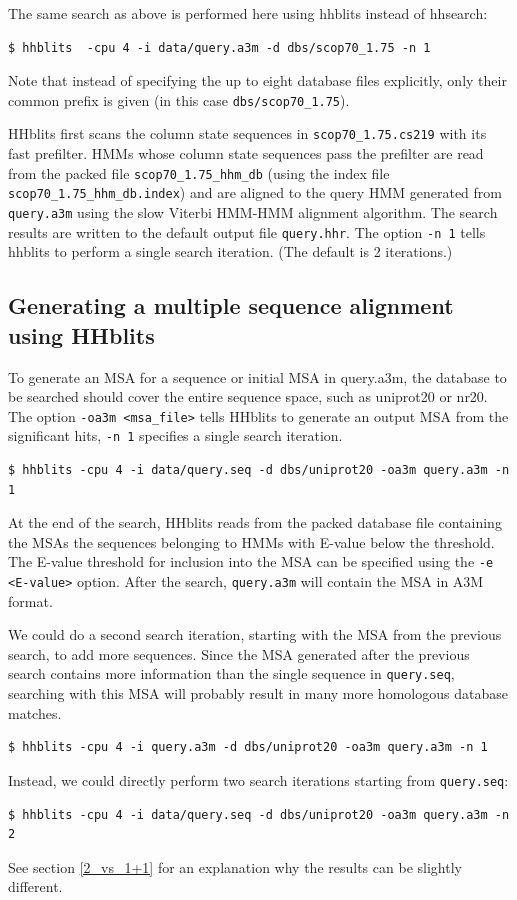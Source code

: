 \documentclass[11pt,a4paper]{article}
\begin{document}
The same search as above is performed here using hhblits instead of hhsearch:
\begin{verbatim}
$ hhblits  -cpu 4 -i data/query.a3m -d dbs/scop70_1.75 -n 1
\end{verbatim}
Note that instead of specifying the up to eight database files explicitly, only their common prefix
is given (in this case \verb`dbs/scop70_1.75`).

HHblits first scans the column state sequences in \verb`scop70_1.75.cs219` with its fast prefilter. HMMs whose column state sequences pass the prefilter are read from the packed file \verb`scop70_1.75_hhm_db` (using the index file \verb`scop70_1.75_hhm_db.index`) and are aligned to the query HMM generated from \verb`query.a3m` using the slow Viterbi HMM-HMM alignment algorithm. The search results are written to the default output file \verb`query.hhr`. The option \verb`-n 1` tells hhblits to perform a single search iteration. (The default is 2 iterations.)


\subsection{Generating a multiple sequence alignment using HHblits}\label{msa_hhblits}

To generate an MSA for a sequence or initial MSA in query.a3m, the database to be searched should cover the entire sequence space, such as uniprot20 or nr20. The option \verb`-oa3m <msa_file>` tells HHblits to generate an output MSA from the significant hits, \verb`-n 1` specifies a single search iteration.
\begin{verbatim}
$ hhblits -cpu 4 -i data/query.seq -d dbs/uniprot20 -oa3m query.a3m -n 1
\end{verbatim}

At the end of the search, HHblits reads from the packed database file containing the MSAs the sequences belonging to HMMs with E-value below the threshold. The E-value threshold for inclusion into the MSA can be specified using the \verb`-e <E-value>` option. After the search, \verb`query.a3m` will contain the MSA in A3M format.

We could do a second search iteration, starting with the MSA from the previous search, to add more sequences. Since the MSA generated after the previous search contains more information than the single sequence in \verb`query.seq`, searching with this MSA will probably result in many more homologous database matches.
\begin{verbatim}
$ hhblits -cpu 4 -i query.a3m -d dbs/uniprot20 -oa3m query.a3m -n 1
\end{verbatim}
Instead, we could directly perform two search iterations starting from \verb`query.seq`:
\begin{verbatim}
$ hhblits -cpu 4 -i data/query.seq -d dbs/uniprot20 -oa3m query.a3m -n 2 
\end{verbatim}
See section \ref{2_vs_1+1} for an explanation why the results can be slightly different.
\end{document}
